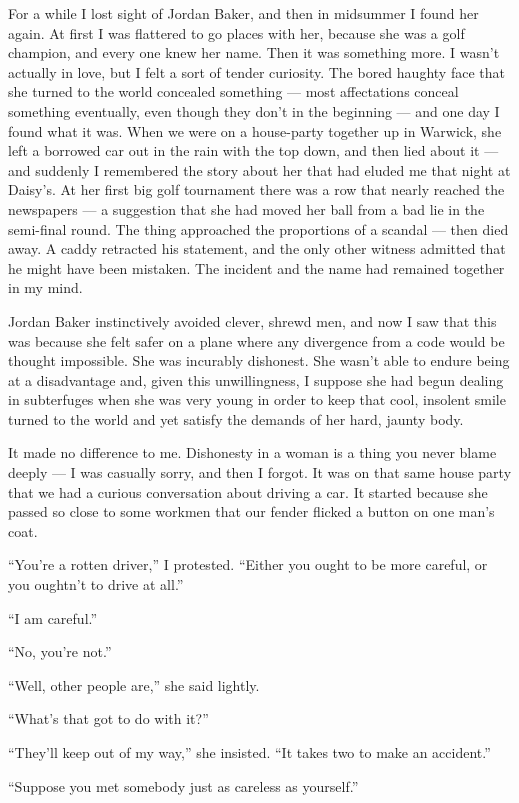 \documentclass{znotebook}
\begin{document}
For a while I lost sight of Jordan Baker, and then in midsummer I found her again. At first I was flattered to go places with her, because she was a golf champion, and every one knew her name. Then it was something more. I wasn’t actually in love, but I felt a sort of tender curiosity. The bored haughty face that she turned to the world concealed something — most affectations conceal something eventually, even though they don’t in the beginning — and one day I found what it was. When we were on a house-party together up in Warwick, she left a borrowed car out in the rain with the top down, and then lied about it — and suddenly I remembered the story about her that had eluded me that night at Daisy’s. At her first big golf tournament there was a row that nearly reached the newspapers — a suggestion that she had moved her ball from a bad lie in the semi-final round. The thing approached the proportions of a scandal — then died away. A caddy retracted his statement, and the only other witness admitted that he might have been mistaken. The incident and the name had remained together in my mind.

Jordan Baker instinctively avoided clever, shrewd men, and now I saw that this was because she felt safer on a plane where any divergence from a code would be thought impossible. She was incurably dishonest. She wasn’t able to endure being at a disadvantage and, given this unwillingness, I suppose she had begun dealing in subterfuges when she was very young in order to keep that cool, insolent smile turned to the world and yet satisfy the demands of her hard, jaunty body.

It made no difference to me. Dishonesty in a woman is a thing you never blame deeply — I was casually sorry, and then I forgot. It was on that same house party that we had a curious conversation about driving a car. It started because she passed so close to some workmen that our fender flicked a button on one man’s coat.

``You’re a rotten driver,'' I protested. ``Either you ought to be more careful, or you oughtn’t to drive at all.''

``I am careful.''

``No, you’re not.''

``Well, other people are,'' she said lightly.

``What’s that got to do with it?''

``They’ll keep out of my way,'' she insisted. ``It takes two to make an accident.''

``Suppose you met somebody just as careless as yourself.''
\end{document}

